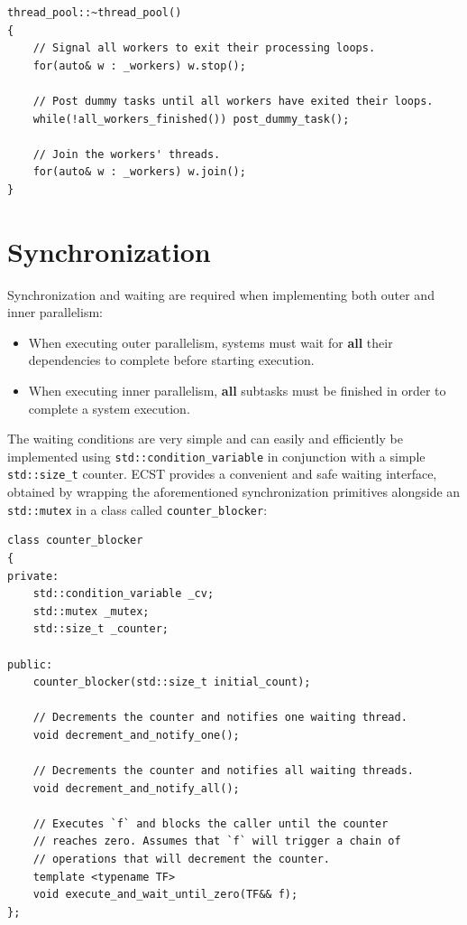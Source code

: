 \documentclass[oneside, 12pt, a4paper, openany]{book}
\begin{document}
\begin{verbatim}
thread_pool::~thread_pool()
{
    // Signal all workers to exit their processing loops.
    for(auto& w : _workers) w.stop();

    // Post dummy tasks until all workers have exited their loops.
    while(!all_workers_finished()) post_dummy_task();

    // Join the workers' threads.
    for(auto& w : _workers) w.join();
}
\end{verbatim}

\section{Synchronization}\label{synchronization}

Synchronization and waiting are required when implementing both outer
and inner parallelism:

\begin{itemize}
\item
  When executing outer parallelism, systems must wait for \textbf{all}
  their dependencies to complete before starting execution.
\item
  When executing inner parallelism, \textbf{all} subtasks must be
  finished in order to complete a system execution.
\end{itemize}

The waiting conditions are very simple and can easily and efficiently be
implemented using
\texttt{std::condition_variable}
in conjunction with a simple
\texttt{std::size_t}
counter. ECST provides a convenient and safe waiting interface, obtained
by wrapping the aforementioned synchronization primitives alongside an
\texttt{std::mutex}
in a class called
\texttt{counter_blocker}:

\begin{verbatim}
class counter_blocker
{
private:
    std::condition_variable _cv;
    std::mutex _mutex;
    std::size_t _counter;

public:
    counter_blocker(std::size_t initial_count);

    // Decrements the counter and notifies one waiting thread.
    void decrement_and_notify_one();

    // Decrements the counter and notifies all waiting threads.
    void decrement_and_notify_all();

    // Executes `f` and blocks the caller until the counter
    // reaches zero. Assumes that `f` will trigger a chain of
    // operations that will decrement the counter.
    template <typename TF>
    void execute_and_wait_until_zero(TF&& f);
};
\end{verbatim}
\end{document}
